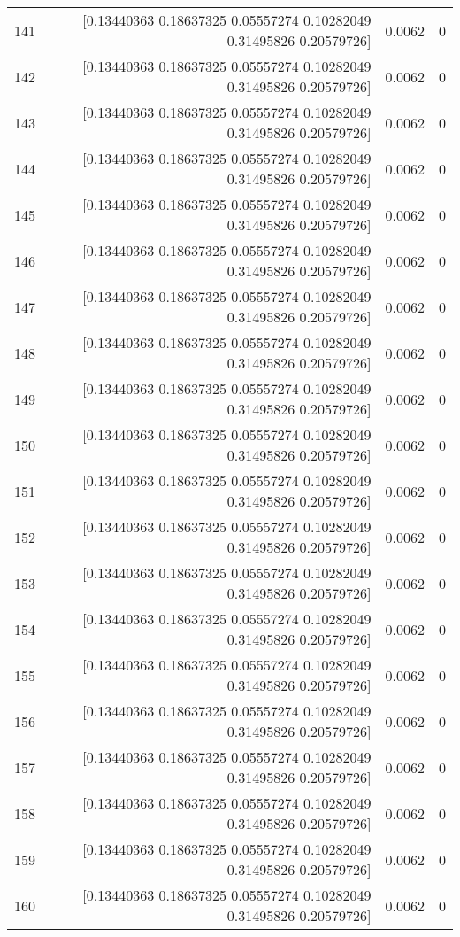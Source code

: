\begin{longtable}{lrrr}
141 & [0.13440363 0.18637325 0.05557274 0.10282049 0.31495826 0.20579726] & 0.0062 & 0 \\
142 & [0.13440363 0.18637325 0.05557274 0.10282049 0.31495826 0.20579726] & 0.0062 & 0 \\
143 & [0.13440363 0.18637325 0.05557274 0.10282049 0.31495826 0.20579726] & 0.0062 & 0 \\
144 & [0.13440363 0.18637325 0.05557274 0.10282049 0.31495826 0.20579726] & 0.0062 & 0 \\
145 & [0.13440363 0.18637325 0.05557274 0.10282049 0.31495826 0.20579726] & 0.0062 & 0 \\
146 & [0.13440363 0.18637325 0.05557274 0.10282049 0.31495826 0.20579726] & 0.0062 & 0 \\
147 & [0.13440363 0.18637325 0.05557274 0.10282049 0.31495826 0.20579726] & 0.0062 & 0 \\
148 & [0.13440363 0.18637325 0.05557274 0.10282049 0.31495826 0.20579726] & 0.0062 & 0 \\
149 & [0.13440363 0.18637325 0.05557274 0.10282049 0.31495826 0.20579726] & 0.0062 & 0 \\
150 & [0.13440363 0.18637325 0.05557274 0.10282049 0.31495826 0.20579726] & 0.0062 & 0 \\
151 & [0.13440363 0.18637325 0.05557274 0.10282049 0.31495826 0.20579726] & 0.0062 & 0 \\
152 & [0.13440363 0.18637325 0.05557274 0.10282049 0.31495826 0.20579726] & 0.0062 & 0 \\
153 & [0.13440363 0.18637325 0.05557274 0.10282049 0.31495826 0.20579726] & 0.0062 & 0 \\
154 & [0.13440363 0.18637325 0.05557274 0.10282049 0.31495826 0.20579726] & 0.0062 & 0 \\
155 & [0.13440363 0.18637325 0.05557274 0.10282049 0.31495826 0.20579726] & 0.0062 & 0 \\
156 & [0.13440363 0.18637325 0.05557274 0.10282049 0.31495826 0.20579726] & 0.0062 & 0 \\
157 & [0.13440363 0.18637325 0.05557274 0.10282049 0.31495826 0.20579726] & 0.0062 & 0 \\
158 & [0.13440363 0.18637325 0.05557274 0.10282049 0.31495826 0.20579726] & 0.0062 & 0 \\
159 & [0.13440363 0.18637325 0.05557274 0.10282049 0.31495826 0.20579726] & 0.0062 & 0 \\
160 & [0.13440363 0.18637325 0.05557274 0.10282049 0.31495826 0.20579726] & 0.0062 & 0 \\

\end{longtable}
